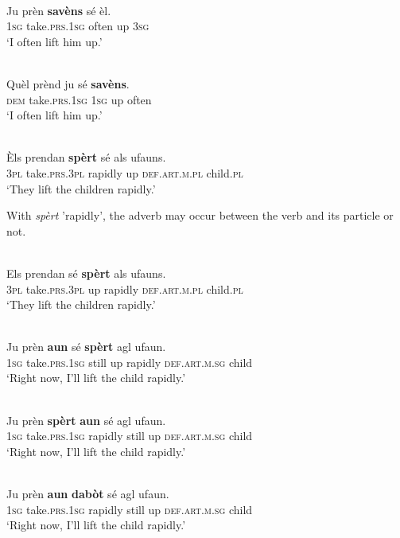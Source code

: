 \ea\label{}
\\
\gll    Ju prèn \textbf{savèns} sé èl.\\
     \textsc{1sg} take.\textsc{prs.1sg} often up \textsc{3sg}\\
\glt `I often lift him up.'
\z

\ea\label{}
\\
\gll    Quèl prènd ju sé \textbf{savèns}.\\
     \textsc{dem} take.\textsc{prs.1sg} \textsc{1sg} up often\\
\glt `I often lift him up.'
\z

\ea\label{}
\\
\gll Èls prendan \textbf{spèrt} sé als ufauns.   \\
   \textsc{3pl} take.\textsc{prs.3pl} rapidly up \textsc{def.art.m.pl} child.\textsc{pl}  \\
\glt `They lift the children rapidly.'
\z

With \textit{spèrt} 'rapidly', the adverb may occur between the verb and its particle or not.

\ea\label{}
\\
\gll Els prendan sé \textbf{spèrt} als ufauns.   \\
   \textsc{3pl} take.\textsc{prs.3pl} up rapidly \textsc{def.art.m.pl} child.\textsc{pl}  \\
\glt `They lift the children rapidly.'
\z

\ea\label{}
\\
\gll Ju prèn \textbf{aun} sé \textbf{spèrt} agl ufaun.    \\
    \textsc{1sg} take.\textsc{prs.1sg} still up rapidly \textsc{def.art.m.sg} child \\
\glt `Right now, I’ll lift the child rapidly.'
\z

\ea\label{}
\\
\gll Ju prèn \textbf{spèrt} \textbf{aun} sé agl ufaun.    \\
    \textsc{1sg} take.\textsc{prs.1sg} rapidly still up \textsc{def.art.m.sg} child \\
\glt `Right now, I’ll lift the child rapidly.'
\z

\ea\label{}
\\
\gll Ju prèn \textbf{aun} \textbf{dabòt} sé agl ufaun.    \\
    \textsc{1sg} take.\textsc{prs.1sg} rapidly still up \textsc{def.art.m.sg} child \\
\glt `Right now, I’ll lift the child rapidly.'
\z

